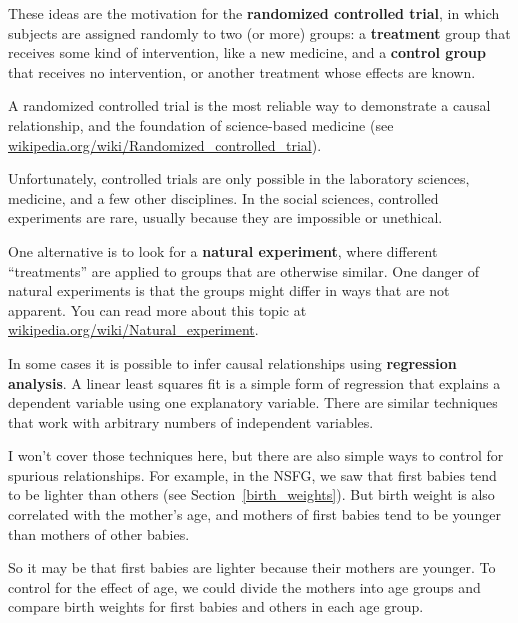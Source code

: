 \documentclass[12pt]{book}
\begin{document}
These ideas are the motivation for the {\bf randomized controlled
trial}, in which subjects are assigned randomly to two (or more)
groups: a {\bf treatment} group that receives some kind of intervention,
like a new medicine, and a {\bf control group} that receives
no intervention, or another treatment whose effects are known.


A randomized controlled trial is the most reliable way to demonstrate
a causal relationship, and the foundation of science-based medicine
(see \url{wikipedia.org/wiki/Randomized_controlled_trial}).

Unfortunately, controlled trials are only possible in the laboratory
sciences, medicine, and a few other disciplines.  In the social sciences,
controlled experiments are rare, usually because they are impossible
or unethical.

One alternative is to look for a {\bf natural experiment}, where
different ``treatments'' are applied to groups that are otherwise
similar.  One danger of natural experiments is that the groups might
differ in ways that are not apparent.  You can read more about this
topic at \url{wikipedia.org/wiki/Natural_experiment}.


In some cases it is possible to infer causal relationships using {\bf
  regression analysis}.  A linear least squares fit
is a simple form of regression that explains a dependent
variable using one explanatory variable.  There are similar
techniques that work with arbitrary numbers of independent variables.


I won't cover those techniques here, but there are also simple ways to
control for spurious relationships.  For example, in the NSFG, we saw
that first babies tend to be lighter than others (see
Section~\ref{birth_weights}).  But birth weight is also correlated
with the mother's age, and mothers of first babies tend to be younger
than mothers of other babies.


So it may be that first babies are lighter because their mothers are
younger.  To control for the effect of age, we could divide the mothers
into age groups and compare birth weights for first babies and others
in each age group.
\end{document}
